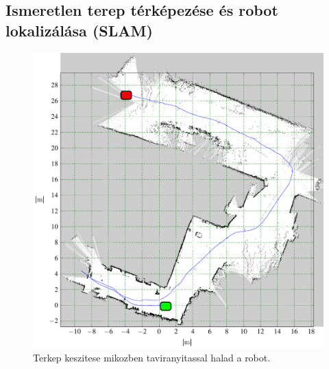 





\renewcommand{\GlobalPath}{Meresek/Mozgasok/GyergyoFuvesUdvar/M1/}
\renewcommand{\plotRotSpeed}{o}
\renewcommand{\plotSpeed}{o}
%

\renewcommand{\GlobalPath}{Meresek/Mozgasok/M6/}
%

\renewcommand{\GlobalPath}{Meresek/Mozgasok/SzobaElore/}
%

\renewcommand{\GlobalPath}{Meresek/Mozgasok/SzobaBalraDiff/}
%

%






\newpage

\subsection{Ismeretlen terep térképezése és robot lokalizálása (SLAM)}


\begin{figure}[H]
  \label{fig:hatsoudvarmap}
  \includegraphics{tikz/hatsoudvarmap.pdf}
  \caption{Terkep keszitese mikozben taviranyitassal halad a robot.}
\end{figure}




